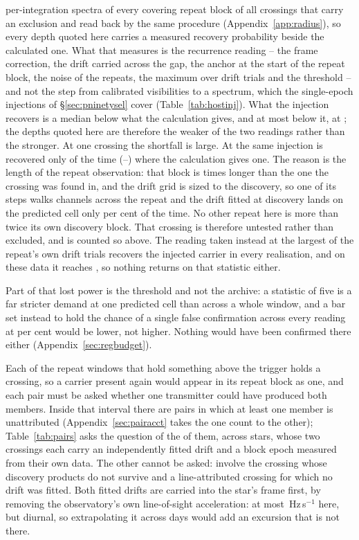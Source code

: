 per-integration spectra of every covering repeat block of all \HjNMeas{}
crossings that carry an exclusion and read back by the same procedure
(Appendix~\ref{app:radius}), so every depth quoted here carries a measured
recovery probability beside the calculated one. What that measures is the recurrence reading
-- the frame correction, the drift carried across the gap, the anchor at the
start of the repeat block, the noise of the repeats, the maximum over drift
trials and the threshold -- and not the step from calibrated visibilities to a
spectrum, which the single-epoch injections of \S\ref{sec:pninetysel} cover
(Table~\ref{tab:hostinj}). What the injection recovers is a median
\HjDevMed{} below what the calculation gives, and at most \HjDevMaxOther{}
below it, at \HjDevStarOther; the depths quoted here are therefore the weaker
of the two readings rather than the stronger. At one crossing the shortfall
is large. At \HjEtaStar{} the same injection is recovered only
\HjEtaMeas{} of the time (\HjEtaLo--\HjEtaHi) where the calculation gives
one. The reason is the length of the repeat observation: that block is
\HjEtaLenRatio{} times longer than the one the crossing was found in, and
the drift grid is sized to the discovery, so one of its steps walks
\HjEtaWalkCh{} channels across the repeat and the drift fitted at discovery
lands on the predicted cell only \HjEtaFracOkPct{} per cent of the time. No
other repeat here is more than twice its own discovery block. That crossing is therefore untested rather than excluded,
and is counted so above. The reading taken instead at the largest of the
repeat's own drift trials recovers the injected carrier in every realisation,
and on these data it reaches \HjEtaMaxReal, so nothing returns on that
statistic either.

Part of that lost power is the threshold and not the archive: a statistic of
five is a far stricter demand at one predicted cell than across a whole
window, and a bar set instead to hold the chance of a single false
confirmation across every reading at \ZtFwPct{} per cent would be lower, not
higher. Nothing would have been confirmed there either
(Appendix~\ref{sec:regbudget}).

Each of the \WdNExc{} repeat windows that hold something above the trigger
holds a crossing, so a carrier present again would appear in its repeat block
as one, and each pair must be asked whether one transmitter could have
produced both members. Inside that interval there are
\TjNCandPair{} pairs in which at least
one member is unattributed (Appendix~\ref{sec:pairacct} takes the one count
to the other); Table~\ref{tab:pairs} asks the question of the
\TjNPair{} of them, across \TjNStarPair{} stars, whose two crossings each
carry an independently fitted drift and a block epoch measured from their own
data. The other \TjNCandLost{} cannot be asked: \TjNCandLostSpec{} involve the
crossing whose discovery products do not survive and \TjNCandLostFit{} a
line-attributed crossing for which no drift was fitted. Both fitted drifts are
carried into the star's frame first, by removing the observatory's own
line-of-sight acceleration: at most \TjFrameMaxHzS\,Hz\,s$^{-1}$ here, but
diurnal, so extrapolating it across days would add an excursion that is not
there.

